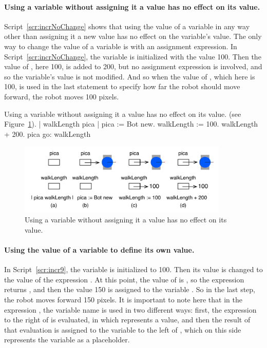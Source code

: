 \documentclass[a4paper,10pt,twoside]{book}
\begin{document}
\newpage
\paragraph{Using a variable without assigning it a value has no effect on its value.}
Script~\ref{scr:incrNoChange} shows that using the value of a variable in any way other than assigning it a new value has no effect on the variable’s value. The only way to change the value of a variable is with an assignment expression. In Script~\ref{scr:incrNoChange}, the variable  is initialized with the value 100. Then the value of , here 100, is added to 200, but   no assignment expression is involved, and so the variable’s value is not modified. And so when the value of , which here is 100, is used in the last statement to specify how far the robot should move forward, the robot moves 100 pixels. 


\begin{script}[incrNoChange]{Using a variable without assigning it a value has no effect on its value. (see Figure~\ref{fig:boxNoChange}).}
	| walkLength pica | 
	pica := Bot new. 
	walkLength := 100. 
	walkLength + 200. 
	pica go: walkLength 
\end{script}

\begin{figure}[h]
	\centerline{\includegraphics[width=10cm]{boxNoChange2}}
	\caption{Using a variable without assigning it a value has no effect on its value.   
	\label{fig:boxNoChange}}
\end{figure}


\paragraph{Using the value of a variable to define its own value.}
In Script~\ref{scr:incr9}, the variable  is initialized to 100. Then its value is changed to the value of the expression . At this point, the value of  is , so the expression  returns , and then the value 150 is assigned to the variable . So in the last step, the robot moves forward 150 pixels. It is important to note here that in the   expression , the variable name  is used in two different ways: first, the expression to the right of \ct{:=} is evaluated, in which  represents a value, and then the result of that evaluation is assigned to the variable  to the left of \ct{:=}, which on this side represents the variable as a placeholder. 
\end{document}
